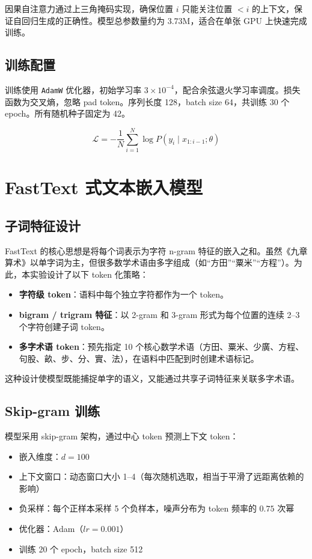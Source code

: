 \documentclass[UTF8,a4paper,twocolumn]{ctexart}
\begin{document}
因果自注意力通过上三角掩码实现，确保位置 $i$ 只能关注位置 $<i$ 的上下文，保证自回归生成的正确性。模型总参数量约为 3.73M，适合在单张 GPU 上快速完成训练。

\subsection{训练配置}

训练使用 \texttt{AdamW} 优化器，初始学习率 $3\times10^{-4}$，配合余弦退火学习率调度。损失函数为交叉熵，忽略 pad token。序列长度 128，batch size 64，共训练 30 个 epoch。所有随机种子固定为 42。

\[
\mathcal{L} = -\frac{1}{N}\sum_{i=1}^{N} \log P(y_i \mid x_{1:i-1}; \theta)
\]

\section{FastText 式文本嵌入模型}

\subsection{子词特征设计}

FastText 的核心思想是将每个词表示为字符 n-gram 特征的嵌入之和。虽然《九章算术》以单字词为主，但很多数学术语由多字组成（如“方田”“粟米”“方程”）。为此，本实验设计了以下 token 化策略：

\begin{itemize}
\item \textbf{字符级 token}：语料中每个独立字符都作为一个 token。
\item \textbf{bigram / trigram 特征}：以 2-gram 和 3-gram 形式为每个位置的连续 2--3 个字符创建子词 token。
\item \textbf{多字术语 token}：预先指定 10 个核心数学术语（方田、粟米、少廣、方程、句股、畝、步、分、實、法），在语料中匹配到时创建术语标记。
\end{itemize}

这种设计使模型既能捕捉单字的语义，又能通过共享子词特征来关联多字术语。

\subsection{Skip-gram 训练}

模型采用 skip-gram 架构，通过中心 token 预测上下文 token：

\begin{itemize}
\item 嵌入维度：$d = 100$
\item 上下文窗口：动态窗口大小 1--4（每次随机选取，相当于平滑了远距离依赖的影响）
\item 负采样：每个正样本采样 5 个负样本，噪声分布为 token 频率的 $0.75$ 次幂
\item 优化器：Adam（$lr=0.001$）
\item 训练 20 个 epoch，batch size 512
\end{itemize}
\end{document}
